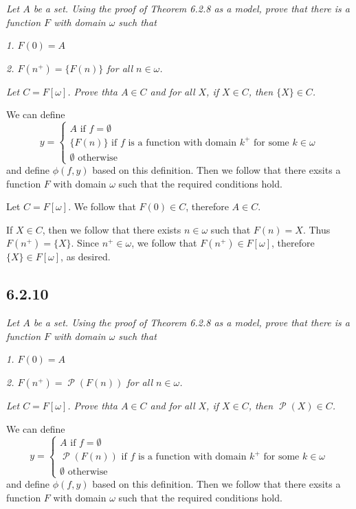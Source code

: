 \documentclass[11pt,oneside,titlepage]{book}
\DeclareMathOperator \pow {\mathcal {P}}
\begin{document}
\textit{Let $A$ be a set. Using the proof of Theorem 6.2.8 as a model, prove that
  there is a function $F$ with domain $\omega$ such that}

\textit{1. $F(0) = A$}

\textit{2. $F(n^+) = \{F(n)\}$ for all $n \in \omega$.}

\textit{Let $C = F[\omega]$. Prove thta $A \in C$ and for all $X$, if $X \in C$,
  then $\{X\} \in C$.}

We can define
$$y =
\begin{cases}
  A \text{ if } f = \emptyset \\
  \{F(n)\} \text{ if $f$ is a function with domain $k^+$ for some $k \in \omega$} \\
  \emptyset \text{ otherwise}
\end{cases}
$$
and define $\phi(f, y)$ based on this definition. Then we follow that there exsits
a function $F$ with domain $\omega$ such that the required conditions hold.

Let $C = F[\omega]$. We follow that $F(0) \in C$, therefore $A \in C$.

If $X \in C$, then we follow that there exists $n \in \omega$ such that
$F(n) = X$. Thus $F(n^+) = \{X\}$. Since $n^+ \in \omega$, we follow that
$F(n^+) \in F[\omega]$, therefore $\{X\} \in F[\omega]$, as desired.

\subsection*{6.2.10}

\textit{Let $A$ be a set. Using the proof of Theorem 6.2.8 as a model, prove that
  there is a function $F$ with domain $\omega$ such that}

\textit{1. $F(0) = A$}

\textit{2. $F(n^+) = \pow(F(n))$ for all $n \in \omega$.}

\textit{Let $C = F[\omega]$. Prove thta $A \in C$ and for all $X$, if $X \in C$,
  then $\pow(X) \in C$.}

We can define
$$y =
\begin{cases}
  A \text{ if } f = \emptyset \\
  \pow(F(n)) \text{ if $f$ is a function with domain $k^+$ for some $k \in \omega$} \\
  \emptyset \text{ otherwise}
\end{cases}
$$
and define $\phi(f, y)$ based on this definition. Then we follow that there exsits
a function $F$ with domain $\omega$ such that the required conditions hold.
\end{document}
